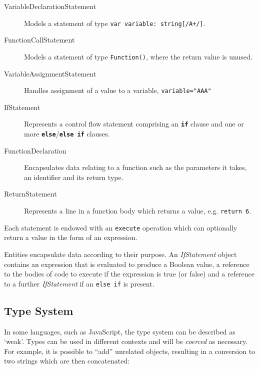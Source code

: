 \documentclass[a4paper,openany,12pt]{book}
\begin{document}
\begin{description}
    \item[VariableDeclarationStatement] Models a statement of type \texttt{var variable: string[/A+/]}.
    \item[FunctionCallStatement] Models a statement of type \texttt{Function()}, where the return value is unused.
    \item[VariableAssignmentStatement] Handles assignment of a value to a variable, \texttt{variable="AAA"}
    \item[IfStatement] Represents a control flow statement comprising an \textbf{\textcolor{id7-aubergine}{\texttt{if}}} clause and one or more \textbf{\textcolor{id7-aubergine}{\texttt{else}}}/\textbf{\textcolor{id7-aubergine}{\texttt{else if}}} clauses.
    \item[FunctionDeclaration] Encapsulates data relating to a function such as the parameters it takes, an identifier and its return type.
    \item[ReturnStatement] Represents a line in a function body which returns a value, e.g. \texttt{return 6}.
\end{description}

Each statement is endowed with an \texttt{execute} operation which can optionally return a value in the form of an
expression.

Entities encapsulate data according to their purpose.
An \textit{IfStatement} object contains an expression that is evaluated to produce a Boolean value, a reference to the
bodies of code to execute if the expression is true (or false) and a reference to a further \textit{IfStatement} if an
\texttt{else if} is present.

\subsection{Type System}

In some languages, such as JavaScript, the type system can be described as `weak'.
Types can be used in different contexts and will be \emph{coerced} as necessary.
For example, it is possible to ``add'' unrelated objects, resulting in a conversion to two strings which are then
concatenated:

\end{document}
